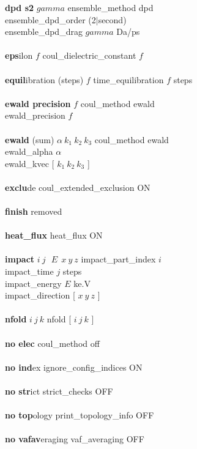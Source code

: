 \begin{tabbing}
\>    {\bf dpd s2} $gamma$ \> ensemble\_method dpd \\
\>    \> ensemble\_dpd\_order (2$|$second) \\
\>    \> ensemble\_dpd\_drag $gamma$ Da/ps \\\\
\>    {\bf eps}ilon $f$ \> coul\_dielectric\_constant $f$ \\\\
\>    {\bf equil}ibration (steps) $f$ \> time\_equilibration $f$ steps \\\\
\>    {\bf ewald precision} $f$ \> coul\_method ewald \\
\> \> ewald\_precision $f$ \\\\
\>    {\bf ewald} (sum) $\alpha~k_{1}~k_{2}~k_{3}$ \> coul\_method ewald \\
\> \> ewald\_alpha $\alpha{}$ \\
\> \> ewald\_kvec [ $k_{1}~k_{2}~k_{3}$ ] \\\\
\>    {\bf exclu}de \> coul\_extended\_exclusion ON \\\\
\>    {\bf finish} \> removed \\\\
\>    {\bf heat\_flux} \> heat\_flux ON \\\\
\>    {\bf impact} $i~j~~~E~~x~y~z$ \> impact\_part\_index $i$ \\
\> \> impact\_time $j$ steps \\
\> \> impact\_energy $E$ ke.V \\
\> \> impact\_direction [ $x~y~z$ ] \\\\
\>    {\bf nfold} $i~j~k$ \> nfold [ $i~j~k$ ] \\\\
\>    {\bf no elec} \> coul\_method off \\\\
\>    {\bf no ind}ex \> ignore\_config\_indices ON \\\\
\>    {\bf no str}ict \> strict\_checks OFF \\\\
\>    {\bf no top}ology \> print\_topology\_info OFF \\\\
\>    {\bf no vafav}eraging \> vaf\_averaging OFF \\\\

\end{tabbing}
